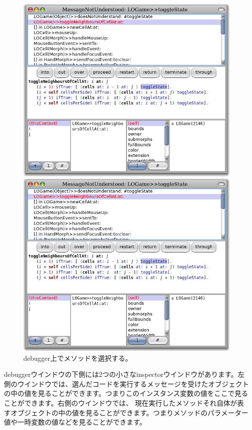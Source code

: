 \documentclass[a4paper,10pt,twoside]{book}
\begin{document}
\begin{figure}[ht]
\ifluluelse
	{\centerline {\includegraphics[width=\textwidth]{Debugger}}}
	{\centerline {\includegraphics[scale=0.7]{Debugger}}}
\caption{debugger上でメソッドを選択する。
}
\end{figure}

debuggerウインドウの下側には2つの小さなinspectorウインドウがあります。左側のウインドウでは、選んだコードを実行するメッセージを受けたオブジェクトの中の値を見ることができます。つまりこのインスタンス変数の値をここで見ることができます。右側のウインドウでは、 現在実行したメソッドそれ自体が表すオブジェクトの中の値を見ることができます。つまりメソッドのパラメーター値や一時変数の値などを見ることができます。
\end{document}
